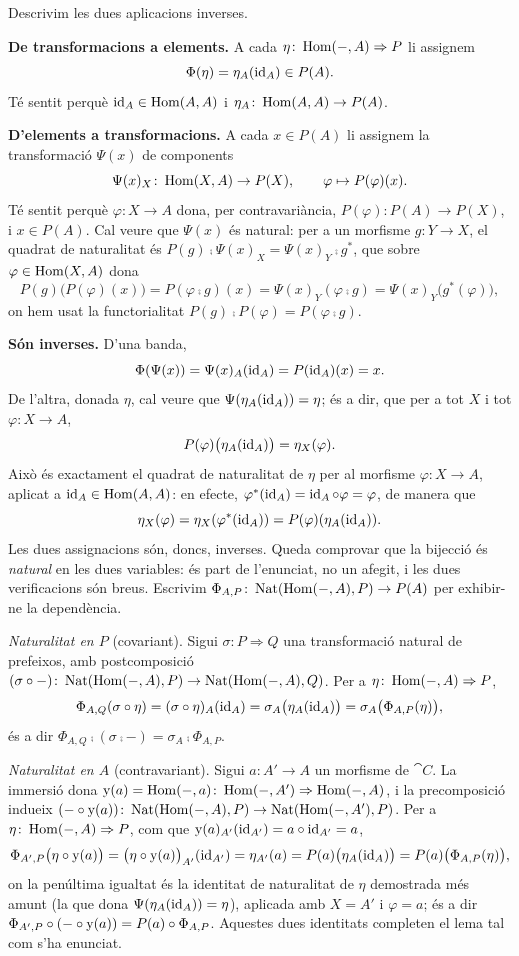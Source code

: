 \begin{prova}
Descrivim les dues aplicacions inverses.

\textbf{De transformacions a elements.} A cada $\eta\colon\operatorname{Hom}(-,A)\Rightarrow P$ li assignem
\[
\Phi(\eta)=\eta_A(\operatorname{id}_A)\in P(A).
\]
Té sentit perquè $\operatorname{id}_A\in\operatorname{Hom}(A,A)$ i $\eta_A\colon\operatorname{Hom}(A,A)\to P(A)$.

\textbf{D'elements a transformacions.} A cada $x\in P(A)$ li assignem la transformació $\Psi(x)$ de components
\[
\Psi(x)_X\colon\operatorname{Hom}(X,A)\to P(X),
\qquad
\varphi\mapsto P(\varphi)(x).
\]
Té sentit perquè $\varphi\colon X\to A$ dona, per contravariància, $P(\varphi)\colon P(A)\to P(X)$, i $x\in P(A)$. Cal veure que $\Psi(x)$ és natural: per a un morfisme $g\colon Y\to X$, el quadrat de naturalitat és $P(g)\comp\Psi(x)_X=\Psi(x)_Y\comp g^*$, que sobre $\varphi\in\operatorname{Hom}(X,A)$ dona
\[
P(g)\big(P(\varphi)(x)\big)=P(\varphi\comp g)(x)=\Psi(x)_Y(\varphi\comp g)=\Psi(x)_Y\big(g^*(\varphi)\big),
\]
on hem usat la functorialitat $P(g)\comp P(\varphi)=P(\varphi\comp g)$.

\textbf{Són inverses.} D'una banda,
\[
\Phi(\Psi(x))=\Psi(x)_A(\operatorname{id}_A)=P(\operatorname{id}_A)(x)=x.
\]
De l'altra, donada $\eta$, cal veure que $\Psi(\eta_A(\operatorname{id}_A))=\eta$; és a dir, que per a tot $X$ i tot $\varphi\colon X\to A$,
\[
P(\varphi)\big(\eta_A(\operatorname{id}_A)\big)=\eta_X(\varphi).
\]
Això és exactament el quadrat de naturalitat de $\eta$ per al morfisme $\varphi\colon X\to A$, aplicat a $\operatorname{id}_A\in\operatorname{Hom}(A,A)$: en efecte, $\varphi^*(\operatorname{id}_A)=\operatorname{id}_A\circ\varphi=\varphi$, de manera que
\[
\eta_X(\varphi)=\eta_X(\varphi^*(\operatorname{id}_A))=P(\varphi)(\eta_A(\operatorname{id}_A)).
\]
Les dues assignacions són, doncs, inverses. Queda comprovar que la bijecció és \emph{natural} en les dues variables: és part de l'enunciat, no un afegit, i les dues verificacions són breus. Escrivim $\Phi_{A,P}\colon\operatorname{Nat}(\operatorname{Hom}(-,A),P)\to P(A)$ per exhibir-ne la dependència.

\emph{Naturalitat en $P$} (covariant). Sigui $\sigma\colon P\Rightarrow Q$ una transformació natural de prefeixos, amb postcomposició $(\sigma\circ-)\colon\operatorname{Nat}(\operatorname{Hom}(-,A),P)\to\operatorname{Nat}(\operatorname{Hom}(-,A),Q)$. Per a $\eta\colon\operatorname{Hom}(-,A)\Rightarrow P$,
\[
\Phi_{A,Q}(\sigma\circ\eta)=(\sigma\circ\eta)_A(\operatorname{id}_A)=\sigma_A\big(\eta_A(\operatorname{id}_A)\big)=\sigma_A\big(\Phi_{A,P}(\eta)\big),
\]
és a dir $\Phi_{A,Q}\comp(\sigma\comp-)=\sigma_A\comp\Phi_{A,P}$.

\emph{Naturalitat en $A$} (contravariant). Sigui $a\colon A'\to A$ un morfisme de $\cat{C}$. La immersió dona $\mathrm{y}(a)=\operatorname{Hom}(-,a)\colon\operatorname{Hom}(-,A')\Rightarrow\operatorname{Hom}(-,A)$, i la precomposició indueix $(-\circ\mathrm{y}(a))\colon\operatorname{Nat}(\operatorname{Hom}(-,A),P)\to\operatorname{Nat}(\operatorname{Hom}(-,A'),P)$. Per a $\eta\colon\operatorname{Hom}(-,A)\Rightarrow P$, com que $\mathrm{y}(a)_{A'}(\operatorname{id}_{A'})=a\circ\operatorname{id}_{A'}=a$,
\[
\Phi_{A',P}\big(\eta\circ\mathrm{y}(a)\big)=\big(\eta\circ\mathrm{y}(a)\big)_{A'}(\operatorname{id}_{A'})=\eta_{A'}(a)=P(a)\big(\eta_A(\operatorname{id}_A)\big)=P(a)\big(\Phi_{A,P}(\eta)\big),
\]
on la penúltima igualtat és la identitat de naturalitat de $\eta$ demostrada més amunt (la que dona $\Psi(\eta_A(\operatorname{id}_A))=\eta$), aplicada amb $X=A'$ i $\varphi=a$; és a dir $\Phi_{A',P}\circ(-\circ\mathrm{y}(a))=P(a)\circ\Phi_{A,P}$. Aquestes dues identitats completen el lema tal com s'ha enunciat.
\end{prova}

